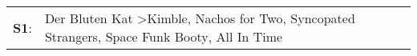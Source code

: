 \begin{supertabular}{p{0.03\textwidth}p{0.92\textwidth}}
 \textbf{S1}:  &  Der Bluten Kat\textsuperscript{} \textgreater \enspace Kimble\textsuperscript{}, \enspace Nachos for Two\textsuperscript{}, \enspace Syncopated Strangers\textsuperscript{}, \enspace Space Funk Booty\textsuperscript{}, \enspace All In Time\textsuperscript{}  \enspace  \\
\end{supertabular}
